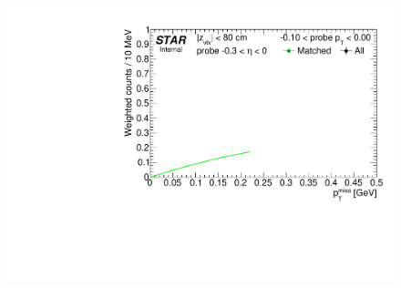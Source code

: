 \begin{figure}[ht]
{  \includegraphics[width=\linewidth,page=11]{graphics/correctionsToEff/TOF_tagAndProbe/Fitting_effVsPt_data_ETABINS_C.CPT2.pdf}

}
\end{figure}
